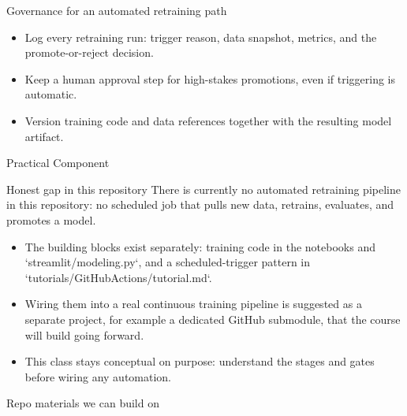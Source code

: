 \begin{frame}{Governance for an automated retraining path}
\begin{itemize}
\item Log every retraining run: trigger reason, data snapshot, metrics, and the promote-or-reject decision.
\item Keep a human approval step for high-stakes promotions, even if triggering is automatic.
\item Version training code and data references together with the resulting model artifact.
\end{itemize}
\coursefooter
\end{frame}

\begin{frame}{Practical Component}
\begin{block}{Honest gap in this repository}
There is currently no automated retraining pipeline in this repository: no scheduled job that pulls new data, retrains, evaluates, and promotes a model.
\end{block}
\begin{itemize}
\item The building blocks exist separately: training code in the notebooks and `streamlit/modeling.py`, and a scheduled-trigger pattern in `tutorials/GitHubActions/tutorial.md`.
\item Wiring them into a real continuous training pipeline is suggested as a separate project, for example a dedicated GitHub submodule, that the course will build going forward.
\item This class stays conceptual on purpose: understand the stages and gates before wiring any automation.
\end{itemize}
\coursefooter
\end{frame}

\begin{frame}{Repo materials we can build on}
\coursefooter
\end{frame}

